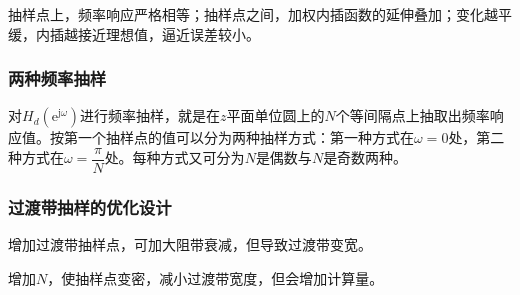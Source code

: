 \documentclass[cn, hazy, blue, normal, 12pt]{elegantnote}
\begin{document}
抽样点上，频率响应严格相等；抽样点之间，加权内插函数的延伸叠加；变化越平缓，内插越接近理想值，逼近误差较小。

\subsubsection{两种频率抽样}

对$H_d\left(\text{e}^{\text{j}\omega}\right)$进行频率抽样，就是在$z$平面单位圆上的$N$个等间隔点上抽取出频率响应值。按第一个抽样点的值可以分为两种抽样方式：第一种方式在$\omega=0$处，第二种方式在$\omega=\dfrac{\pi}{N}$处。每种方式又可分为$N$是偶数与$N$是奇数两种。

\subsubsection{过渡带抽样的优化设计}

增加过渡带抽样点，可加大阻带衰减，但导致过渡带变宽。

增加$N$，使抽样点变密，减小过渡带宽度，但会增加计算量。
\end{document}
